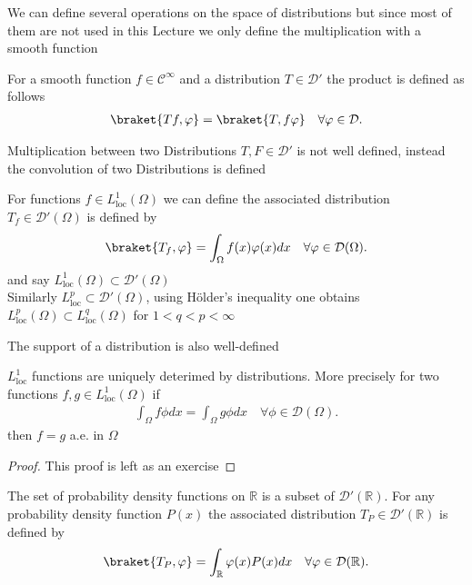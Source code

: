 We can define several operations on the space of distributions but since most of them are not used in this Lecture 
we only define the multiplication with a smooth function 
\begin{definition}
For a smooth function $f \in  \mathcal{C}^{\infty} $ and a distribution $T \in \mathcal{D}'$ the product is defined as follows 
\begin{align*}
  \braket{Tf,\phi } = \braket{T,f \phi} \quad \forall \phi  \in  \mathcal{D}
.\end{align*}
\end{definition}
\begin{remark}
 Multiplication between two Distributions $T,F \in  \mathcal{D}'$ is not well defined, 
 instead the convolution of two Distributions is defined 
\end{remark}
\begin{example}
  For functions $f \in  L^{1}_{\text{loc}}(\Omega ) $  we can define the associated distribution $T_f \in  \mathcal{D}'(\Omega )$ is defined by 
  \begin{align*}
    \braket{T_f,\phi } = \int_\Omega  f(x)\phi(x) dx \quad \forall \phi  \in \mathcal{D}(\Omega )
  .\end{align*}
  and say $L_{\text{loc}}^{1}(\Omega ) \subset \mathcal{D}'(\Omega )  $\\[1ex]
  Similarly $L^{p}_{\text{loc}} \subset  \mathcal{D}'(\Omega ) $, using Hölder's inequality one obtains
  $L_{\text{loc}}^{p}(\Omega ) \subset L_{\text{loc}}^{q}(\Omega )   $ for $1<q<p<\infty$
\end{example}
\begin{remark}
 The support of a distribution is also well-defined 
\end{remark}
\begin{theorem}
  $L^{1}_{\text{loc}} $ functions are uniquely deterimed by distributions. More precisely 
  for two functions $f,g \in  L_{\text{loc}}^{1}(\Omega ) $  if 
  \begin{align*}
    \int_\Omega  f \phi dx = \int_\Omega  g \phi dx \quad \forall \phi  \in \mathcal{D}(\Omega )
  .\end{align*}
  then $f = g$ a.e. in $\Omega $
\end{theorem}
\begin{proof}
 This proof is left as an exercise  
\end{proof}
\begin{example}
 The set of probability density functions on $\mathbb{R}$ is a subset of $\mathcal{D}'(\mathbb{R} )$.
 For any probability density function $P(x)$ the associated distribution  $T_P \in \mathcal{D}'(\mathbb{R})$
 is defined by
 \begin{align*}
   \braket{T_P,\phi } = \int_\mathbb{R} \phi(x) P(x) dx \quad \forall  \phi  \in \mathcal{D}(\mathbb{R})
 .\end{align*}
\end{example}
